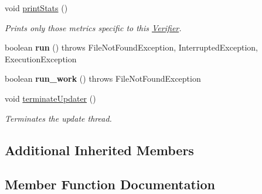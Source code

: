 \begin{DoxyCompactItemize}
\item 
void \hyperlink{classedu_1_1udel_1_1cis_1_1vsl_1_1civl_1_1run_1_1IF_1_1Verifier_a138aae2d3d2bd19e3bc9fc84d17937d8}{print\+Stats} ()
\begin{DoxyCompactList}\small\item\em Prints only those metrics specific to this \hyperlink{classedu_1_1udel_1_1cis_1_1vsl_1_1civl_1_1run_1_1IF_1_1Verifier}{Verifier}. \end{DoxyCompactList}\item 
\hypertarget{classedu_1_1udel_1_1cis_1_1vsl_1_1civl_1_1run_1_1IF_1_1Verifier_af44a61241a34d8a1306f131df8da29c1}{}boolean {\bfseries run} ()  throws File\+Not\+Found\+Exception, Interrupted\+Exception, 			\+Execution\+Exception \label{classedu_1_1udel_1_1cis_1_1vsl_1_1civl_1_1run_1_1IF_1_1Verifier_af44a61241a34d8a1306f131df8da29c1}

\item 
\hypertarget{classedu_1_1udel_1_1cis_1_1vsl_1_1civl_1_1run_1_1IF_1_1Verifier_a6d4b3c5fe51c97d6745a5a3b5936049c}{}boolean {\bfseries run\+\_\+work} ()  throws File\+Not\+Found\+Exception \label{classedu_1_1udel_1_1cis_1_1vsl_1_1civl_1_1run_1_1IF_1_1Verifier_a6d4b3c5fe51c97d6745a5a3b5936049c}

\item 
void \hyperlink{classedu_1_1udel_1_1cis_1_1vsl_1_1civl_1_1run_1_1IF_1_1Verifier_a01e2fe27fa288bec2d21f8aee7157ad2}{terminate\+Updater} ()
\begin{DoxyCompactList}\small\item\em Terminates the update thread. \end{DoxyCompactList}\end{DoxyCompactItemize}
\subsection*{Additional Inherited Members}


\subsection{Member Function Documentation}
\hypertarget{classedu_1_1udel_1_1cis_1_1vsl_1_1civl_1_1run_1_1IF_1_1Verifier_a138aae2d3d2bd19e3bc9fc84d17937d8}{}
